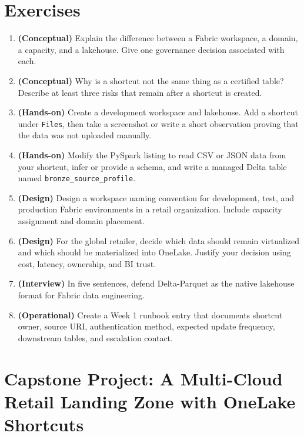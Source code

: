 \section{Exercises}
\begin{enumerate}
    \item \textbf{(Conceptual)} Explain the difference between a Fabric workspace, a domain, a capacity, and a lakehouse. Give one governance decision associated with each.
    \item \textbf{(Conceptual)} Why is a shortcut not the same thing as a certified table? Describe at least three risks that remain after a shortcut is created.
    \item \textbf{(Hands-on)} Create a development workspace and lakehouse. Add a shortcut under \texttt{Files}, then take a screenshot or write a short observation proving that the data was not uploaded manually.
    \item \textbf{(Hands-on)} Modify the PySpark listing to read CSV or JSON data from your shortcut, infer or provide a schema, and write a managed Delta table named \texttt{bronze\_source\_profile}.
    \item \textbf{(Design)} Design a workspace naming convention for development, test, and production Fabric environments in a retail organization. Include capacity assignment and domain placement.
    \item \textbf{(Design)} For the global retailer, decide which data should remain virtualized and which should be materialized into OneLake. Justify your decision using cost, latency, ownership, and BI trust.
    \item \textbf{(Interview)} In five sentences, defend Delta-Parquet as the native lakehouse format for Fabric data engineering.
    \item \textbf{(Operational)} Create a Week 1 runbook entry that documents shortcut owner, source URI, authentication method, expected update frequency, downstream tables, and escalation contact.
\end{enumerate}

\section{Capstone Project: A Multi-Cloud Retail Landing Zone with OneLake Shortcuts}\label{sec:ch1-capstone}

